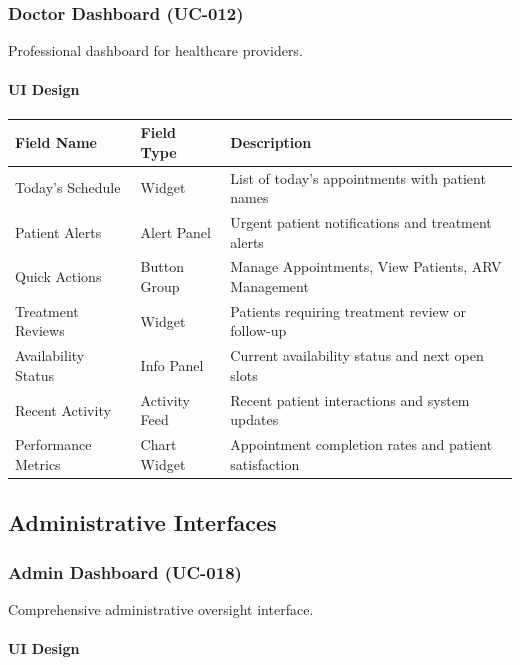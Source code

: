 \documentclass[12pt,a4paper]{article}
\begin{document}
\subsubsection{Doctor Dashboard (UC-012)}

Professional dashboard for healthcare providers.

\paragraph{UI Design}

\begin{longtable}{|p{3cm}|p{3cm}|p{8cm}|}
\hline
\textbf{Field Name} & \textbf{Field Type} & \textbf{Description} \\
\hline
Today's Schedule & Widget & List of today's appointments with patient names \\
\hline
Patient Alerts & Alert Panel & Urgent patient notifications and treatment alerts \\
\hline
Quick Actions & Button Group & Manage Appointments, View Patients, ARV Management \\
\hline
Treatment Reviews & Widget & Patients requiring treatment review or follow-up \\
\hline
Availability Status & Info Panel & Current availability status and next open slots \\
\hline
Recent Activity & Activity Feed & Recent patient interactions and system updates \\
\hline
Performance Metrics & Chart Widget & Appointment completion rates and patient satisfaction \\
\hline
\end{longtable}

\subsection{Administrative Interfaces}

\subsubsection{Admin Dashboard (UC-018)}

Comprehensive administrative oversight interface.

\paragraph{UI Design}
\end{document}
